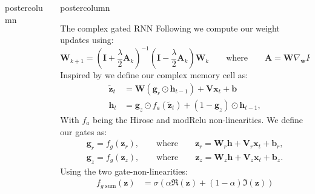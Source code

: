 \documentclass{beamer}
\newcommand{\bm}{\mathbf}
\newcommand{\bW}{\bm{W}}
\newcommand{\bV}{\bm{V}}
\newcommand{\bx}{\bm{x}}
\newcommand{\bh}{\bm{h}}
\newcommand{\bz}{\bm{z}}
\newcommand{\bb}{\bm{b}}
\newlength{\columnheight}
\begin{document}
\begin{frame}
\begin{columns}
\begin{column}{.43\textwidth}
\begin{beamercolorbox}[center]{postercolumn}
\begin{minipage}{.98\textwidth}
{            }\end{minipage}\end{beamercolorbox}
    \end{column}
    \begin{column}{.57\textwidth}
        \begin{beamercolorbox}[center]{postercolumn}
            \begin{minipage}{.98\textwidth} %
                \parbox[t][\columnheight]{\textwidth}{ %
                    \begin{myblock}{The complex gated RNN}
                        Following \cite{Arjovsky} we compute our weight updates using:
                        \begin{equation}
                        \mathbf{W}_{k+1} =  (\mathbf{I} + \frac{\lambda}{2}\mathbf{A}_k)^{-1}(\mathbf{I} - \frac{\lambda}{2}\mathbf{A}_k)\mathbf{W}_k \qquad \text{where} \qquad \mathbf{A} = \mathbf{W}\nabla_{\overline{\bm{w}}}{F} - \overline{\mathbf{W}}\nabla_{{\bm{w}}}{F}
                        \label{eq:Stiefel}
                        \end{equation}
                        Inspired by \cite{cho-al-emnlp14} we define our complex memory cell as: 
                        \begin{align}
                            \widetilde{\bz}_{t} &= \bW (\bm{g}_r \odot \bh_{t-1}) + \bV \bx_{t} + \bb \label{eq:state_candidate} \\
                            \bh_{t} &= \bm{g}_z \odot f_a(\widetilde{\bz}_t) +(1 - \bm{g}_z) \odot \bh_{t-1}, \label{eq:state_update}
                        \end{align}
                        With $f_a$ being the Hirose and modRelu non-linearities. We define our gates as:
                        \begin{align}
                            \bm{g}_r = f_g(\bz_r), \qquad \text{where} \qquad \bz_r = \bW_r \bh + \bV_r \bx_t + \bb_r, \label{eq:dual_gate1} \\
                            \bm{g}_z = f_g(\bz_z), \qquad \text{where} \qquad \bz_z = \bW_z \bh + \bV_z \bx_t + \bb_z.
                            \label{eq:dual_gate2}
                        \end{align}
                        Using the two gate-non-linearities:
                        \begin{align}
                            f_{g\text{ sum}}(\bz) &= \sigma(\alpha \Re(\bz) + (1 - \alpha) \Im(\bz)) \\

\end{align}
\end{myblock}}
\end{minipage}
\end{beamercolorbox}
\end{column}
\end{columns}
\end{frame}
\end{document}
